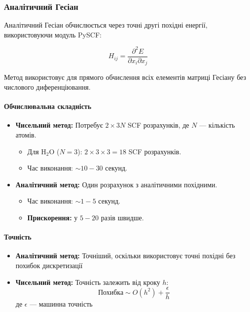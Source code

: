 {\subsubsection{Аналітичний Гесіан}

Аналітичний Гесіан обчислюється через точні другі похідні енергії, використовуючи модуль PySCF:

\begin{equation}
    H_{ij} = \frac{\partial^2 E}{\partial x_i \partial x_j}
\end{equation}

Метод використовує  для прямого обчислення всіх елементів матриці Гесіану без числового диференціювання.


\paragraph{Обчислювальна складність}

\begin{itemize}
    \item \textbf{Чисельний метод:} Потребує $2 \times 3N$ SCF розрахунків, де $N$ --- кількість атомів.
    \begin{itemize}
        \item Для H$_2$O ($N=3$): $2 \times 3 \times 3 = 18$ SCF розрахунків.
        \item Час виконання: $\sim 10 - 30$ секунд.
    \end{itemize}

    \item \textbf{Аналітичний метод:} Один розрахунок з аналітичними похідними.
    \begin{itemize}
        \item Час виконання: $\sim 1 - 5$ секунд.
        \item \textbf{Прискорення:} у $5 - 20$ разів швидше.
    \end{itemize}
\end{itemize}

\paragraph{Точність}

\begin{itemize}
    \item \textbf{Аналітичний метод:} Точніший, оскільки використовує точні похідні без похибок дискретизації

    \item \textbf{Чисельний метод:} Точність залежить від кроку $h$:
    \begin{equation}
        \text{Похибка} \sim O(h^2) + \frac{\epsilon}{h}
    \end{equation}
    де $\epsilon$ --- машинна точність


\end{itemize}}
